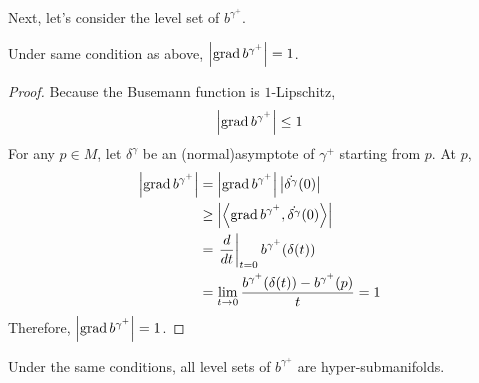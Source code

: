 \begin{enumerate}[label=\arabic{*}.]
	Next, let's consider the level set of $b^{\gamma^+}$.
	\begin{prop}
		Under same condition as above, $\left\lvert\operatorname{grad}b^{\gamma^+}\right\lvert = 1$.
	\end{prop}
	\begin{proof}
		Because the Busemann function is $1$-Lipschitz,
		\begin{equation*}
			\left\lvert\operatorname{grad}b^{\gamma^+}\right\lvert \leq 1
		\end{equation*}
		For any $p \in M$, let $\delta^\gamma$ be an (normal)asymptote of $\gamma^+$ starting from $p$. At $p$,
		\begin{equation*}
			\begin{aligned}
				\left\lvert\operatorname{grad}b^{\gamma^+}\right\lvert &= \left\lvert\operatorname{grad}b^{\gamma^+}\right\lvert\left\lvert\dot{\delta^\gamma}(0)\right\lvert \\
				&\geq \left\lvert\left\langle \operatorname{grad}b^{\gamma^+}, \dot{\delta^\gamma}(0) \right\rangle\right\lvert \\
				&= \left.\frac{d}{dt}\right\lvert_{t=0}b^{\gamma^+}(\delta(t)) \\
				&= \lim_{t \rightarrow 0}\frac{b^{\gamma^+}(\delta(t))-b^{\gamma^+}(p)}{t} = 1
			\end{aligned}
		\end{equation*}
		Therefore, $\left\lvert\operatorname{grad}b^{\gamma^+}\right\lvert = 1$.
	\end{proof}
	\begin{cor}
		Under the same conditions, all level sets of $b^{\gamma^+}$ are hyper-submanifolds.
	\end{cor}


\end{enumerate}
